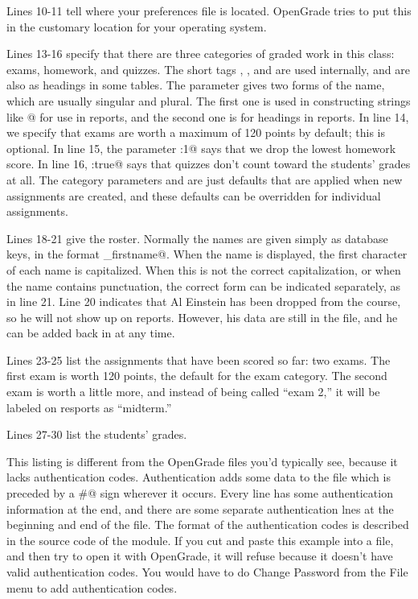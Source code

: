 \documentclass{opengrade_doc}
\begin{document}
Lines 10-11 tell where your preferences file is located. OpenGrade
tries to put this in the customary location for your operating system.

Lines 13-16 specify that there are three categories of graded work in this
class: exams, homework, and quizzes. The short tags \verb@e@, \verb@hw@, and \verb@q@
are used internally, and are also as headings in some tables.
The \verb@catname@ parameter
gives two forms of the name, which are usually singular and plural. The
first one is used in constructing strings like @ for use
in reports, and the second one is for headings in reports.
In line 14, we specify that exams are worth a maximum of 120 points by
default; this is optional. In line 15, the parameter \verb@drop:1@
says that we drop the lowest homework score. In line 16, \verb@ignore:true@
says that quizzes don't count toward the students' grades at all.
The category parameters \verb@ignore@ and \verb@max@ are just
defaults that are applied when new assignments are created, and these
defaults can be overridden for individual assignments.

Lines 18-21 give the roster. Normally the names are given simply as
database keys, in the format \verb@lastname_firstname@. When the name
is displayed, the first character of each name is capitalized. When this
is not the correct capitalization, or when the name contains punctuation,
the correct form can be indicated separately, as in line 21.
Line 20 indicates that Al Einstein has been dropped from the course,
so he will not show up on reports. However, his data are still in the
file, and he can be added back in at any time.

Lines 23-25 list the assignments that have been scored so far: two
exams. The first exam is worth 120 points, the default for the exam
category. The second exam is worth a little more, and instead of
being called ``exam 2,'' it will be labeled on resports as
``midterm.''

Lines 27-30 list the students' grades.

This listing is different from the OpenGrade files you'd typically see, because
it lacks authentication codes. Authentication adds some data to the file
which is preceded by a \verb@#@ sign wherever it occurs. Every line
has some authentication information at the end, and there are some
separate authentication lnes at the beginning and end of the file.
The format of the authentication codes is described in the source
code of the \verb@LineByLine@ module. If you cut and paste this
example into a file, and then try to open it with OpenGrade, it will
refuse because it doesn't have valid authentication codes. You would
have to do Change Password from the File menu to add authentication codes.
\end{document}
